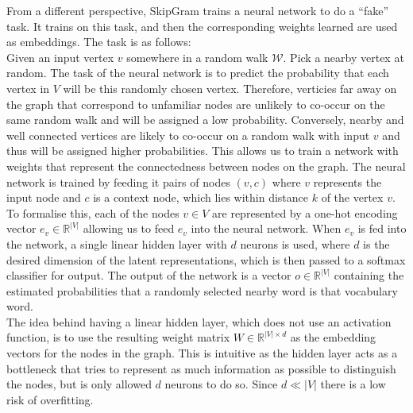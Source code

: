 \documentclass[a4paper]{article}
\begin{document}
From a different perspective, SkipGram trains a neural network to do
a ``fake'' task. It trains on this task, and then the corresponding weights
learned are used as embeddings. The task is as follows:\\
Given an input vertex $v$ somewhere in a random walk $\mathcal{W}$. Pick a
nearby vertex at random. The task of the neural network is to
predict the probability that each vertex in $V$ will be this randomly chosen
vertex. Therefore, verticies far away on the graph that correspond to unfamiliar
nodes are unlikely to co-occur on the same random walk and will be assigned a
low probability. Conversely, nearby and well connected vertices are likely to
co-occur on a random walk with input $v$ and thus will be assigned higher
probabilities. This allows us to train a network with weights that represent the
connectedness between nodes on the graph. The neural network is trained by
feeding it pairs of nodes $(v, c)$ where $v$ represents the input node and $c$
is a context node, which lies within distance $k$ of the vertex $v$.\\
To formalise this, each of the nodes $v \in V$ are represented by a one-hot
encoding vector $e_v \in \mathbb{R}^{|V|}$ allowing us to feed $e_v$ into the
neural network. When $e_v$ is fed into the network, a single linear hidden layer with
$d$ neurons is used, where $d$ is the desired dimension of the latent
representations, which is then passed to a softmax classifier for output. The
output of the network is a vector $o \in \mathbb{R}^{|V|}$ containing the estimated
probabilities that a randomly selected nearby word is that vocabulary word.\\
The idea behind having a linear hidden layer, which does not use an activation
function, is to use the resulting weight matrix $W \in \mathbb{R}^{|V| \times
  d}$ as the embedding vectors for the nodes in the graph. This is intuitive as
the hidden layer acts as a bottleneck that tries to represent as much
information as possible to distinguish the nodes, but is only allowed $d$
neurons to do so. Since $d \ll |V|$ there is a low risk of overfitting.
\end{document}
